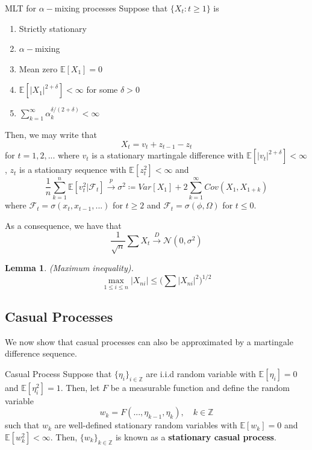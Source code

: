 \documentclass[twoside]{article}
\newtheorem{lemma}[theorem]{Lemma}
\begin{document}
\begin{theorem_exam}{MLT for $\alpha-$mixing processes}{} Suppose that $\{X_t: t \geq 1\}$ is 
\begin{enumerate}
\item Strictly stationary
\item $\alpha-$mixing 
\item Mean zero $\mathbb{E}[X_1] = 0$
\item $\mathbb{E}[|X_1|^{2 + \delta}] < \infty$ for some $\delta > 0$
\item $\sum_{k=1}^{\infty}\alpha_{k}^{\delta/(2 + \delta)} < \infty$
\end{enumerate}

Then, we may write that 
$$
X_t = v_t + z_{t-1} - z_t
$$
for $t = 1,2,...$ where $v_t$ is a stationary martingale difference with $\mathbb{E}[|v_t|^{2 + \delta}] < \infty$, $z_t$ is a stationary sequence with $\mathbb{E}[z_{t}^{2}] < \infty$ and 
$$
\frac{1}{n}\sum_{k=1}^{n}\mathbb{E}[v_{t}^{2}|\mathcal{F}_t] \xrightarrow{p} \sigma^2 \coloneqq Var[X_1] + 2\sum_{k=1}^{\infty}Cov(X_1, X_{1 + k})
$$
where $\mathcal{F}_t = \sigma(x_t, x_{t-1}, ...)$ for $t \geq 2$ and $\mathcal{F}_t = \sigma(\phi, \Omega)$ for $t \leq 0.$

As a consequence, we have that 
$$
\frac{1}{\sqrt{n}}\sum X_t \xrightarrow{D} \mathcal{N}(0, \sigma^2)
$$
\end{theorem_exam}


\begin{lemma}(Maximum inequality).
$$
\max_{1 \leq i \leq n}|X_{ni}| \leq \big(\sum |X_{ni}|^2 \big)^{1/2}
$$
\end{lemma}

\subsection{Casual Processes}

We now show that casual processes can also be approximated by a martingale difference sequence. 

\begin{definition_exam}{Casual Process}{} Suppose that $\{\eta_i\}_{i \in \mathbb{Z}}$ are i.i.d random variable with $\mathbb{E}[\eta_i] = 0$ and $\mathbb{E}[\eta_{i}^{2}] = 1.$ Then, let $F$ be a measurable function and define the random variable 
$$
w_k = F(..., \eta_{k-1}, \eta_{k}), \quad k \in \mathbb{Z}
$$
such that $w_k$ are well-defined stationary random variables with $\mathbb{E}[w_k] = 0$ and $\mathbb{E}[w_{k}^{2}] < \infty.$ Then, $\{w_k\}_{k \in \mathbb{Z}}$ is known as a \textbf{stationary casual process}.
\end{definition_exam}
\end{document}
